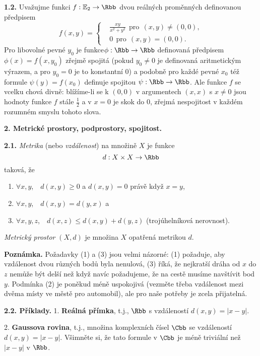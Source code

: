\documentclass[12pt]{article}
\begin{document}
{{\bf 1.2.} Uvažujme funkci $f:\mathbb E_2\to \Rbb$ dvou reálných proměnných definovanou předpisem
$$
f(x,y)=\begin{cases} &\frac{xy}{x^2+y^2}\ \ \text{pro}\ \ (x,y)\neq(0,0),\\
&0\ \ \text{pro}\ \ (x,y)=(0,0).\end{cases}
$$
Pro libovolné pevné $y_0$ je funkce$\phi:\Rbb\to\Rbb$ definovaná předpisem $\phi(x)=f(x,y_0)$ zřejmě spojitá
(pokud $y_0\neq 0$ je definovaná aritmetickým výrazem, a pro $y_0=0$ je to konstantní 0) a podobně
pro každé pevné $x_0$ též formule $\psi(y)=f(x_0)$ definuje spojitou $\psi:\Rbb\to\Rbb$. Ale funkce $f$ se vcelku chová divně: blížíme-li se k $(0,0)$ v argumentech $(x,x)$ s $x\neq 0$ jsou  hodnoty funkce $f$ stále $\frac12$ a v $x=0$ je skok do 0, zřejmá nespojitost v každém rozumném smyslu tohoto slova.



 \vskip10mm
 
 {\large\bf 2. Metrické prostory, podprostory, spojitost.}
  
 \bigskip
 
 
 {\bf 2.1.} {\em Metrika} (nebo {\em  vzdálenost})  na množině $X$ je funkce
 $$
 d:X\times X\to\Rbb
 $$
 taková, že
 \begin{enumerate}
 \item $\forall x,y$,\ \  $d(x,y)\geq 0$ a $d(x,y)=0$ právě když $x=y$,
 \item $\forall x,y$,\ \ $d(x,y)=d(y,x)$ a
 \item $\forall x,y,z$,\ \ $d(x,z)\leq d(x,y)+d(y,z)$ (trojúhelníková nerovnost).
 \end{enumerate}
 
{\em Metrický prostor} $(X,d)$ je množina $X$ opatřená metrikou $d$.
 
 \medskip
 
 {\bf Poznámka.} Požadavky (1) a (3) jsou velmi názorné: (1) požaduje, aby vzdálenost dvou různých bodů byla nenulová, (3) říká, že nejkratší dráha od $x$ do $z$ nemůže být delší než když navíc požadujeme, že na cestě musíme navštívit bod $y$. Podmínka (2) je poněkud méně uspokojivá (vezměte třeba vzdálenost mezi dvěma místy ve městě pro automobil), ale pro naše potřeby je zcela přijatelná.
 
 \bigskip
 
 {\bf 2.2. Příklady.} 1. {\bf Reálná přímka}, t.j., $\Rbb$ s vzdáleností $d(x,y)=|x-y|$.
 
 \smallskip
 
 2. {\bf Gaussova  rovina}, t.j., množina komplexních čísel $\Cbb$ se vzdáleností $d(x,y)=|x-y|$. Všimněte
 si, že tato formule v $\Cbb$ je méně triviální než $|x-y|$ v $\Rbb$.
 
}
\end{document}
